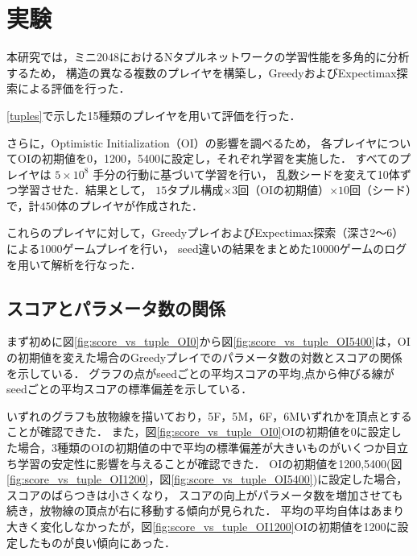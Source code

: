 \section{実験}

本研究では，ミニ2048におけるNタプルネットワークの学習性能を多角的に分析するため，
構造の異なる複数のプレイヤを構築し，GreedyおよびExpectimax探索による評価を行った．

\ref{tuples}で示した15種類のプレイヤを用いて評価を行った．

さらに，Optimistic Initialization（OI）の影響を調べるため，
各プレイヤについてOIの初期値を0，1200，5400に設定し，それぞれ学習を実施した．
すべてのプレイヤは $5 \times 10^8$ 手分の行動に基づいて学習を行い，
乱数シードを変えて10体ずつ学習させた．結果として，
$15$タプル構成$\times 3$回（OIの初期値）$\times 10$回（シード）で，計$450$体のプレイヤが作成された．

これらのプレイヤに対して，GreedyプレイおよびExpectimax探索（深さ2〜6）による1000ゲームプレイを行い，
seed違いの結果をまとめた10000ゲームのログを用いて解析を行なった．

\subsection{スコアとパラメータ数の関係}
まず初めに図\ref{fig:score_vs_tuple_OI0}から図\ref{fig:score_vs_tuple_OI5400}は，OIの初期値を変えた場合のGreedyプレイでのパラメータ数の対数とスコアの関係を示している．
グラフの点がseedごとの平均スコアの平均,点から伸びる線がseedごとの平均スコアの標準偏差を示している．

いずれのグラフも放物線を描いており，5F，5M，6F，6Mいずれかを頂点とすることが確認できた．
また，図\ref{fig:score_vs_tuple_OI0}OIの初期値を0に設定した場合，3種類のOIの初期値の中で平均の標準偏差が大きいものがいくつか目立ち学習の安定性に影響を与えることが確認できた．
OIの初期値を1200,5400(図\ref{fig:score_vs_tuple_OI1200}，図\ref{fig:score_vs_tuple_OI5400})に設定した場合，スコアのばらつきは小さくなり，
スコアの向上がパラメータ数を増加させても続き，放物線の頂点が右に移動する傾向が見られた．
平均の平均自体はあまり大きく変化しなかったが，図\ref{fig:score_vs_tuple_OI1200}OIの初期値を1200に設定したものが良い傾向にあった．

